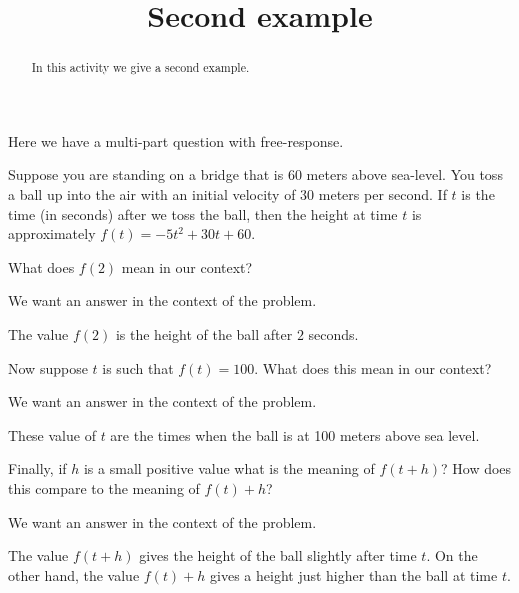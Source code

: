 \documentclass{ximera}
\title{Second example}
\begin{document}
\begin{abstract}
In this activity we give a second example.
\end{abstract} 
\maketitle

Here we have a multi-part question with free-response.

\begin{problem} 
Suppose you are standing on a bridge that is 60 meters above
sea-level. You toss a ball up into the air with an initial velocity of
30 meters per second.  If $t$ is the time (in seconds) after we toss
the ball, then the height at time $t$ is approximately $f(t) = -5 t^2
+30t+60$. 
\begin{parts}[hide]
	\item What does $f(2)$ mean in our context?
	\begin{hints}
		\item We want an answer in the context of the problem. 
	\end{hints}
	\begin{prompt}
		\begin{freeResponse}
			The value $f(2)$ is the height of the ball after $2$ seconds.
		\end{freeResponse}
	\end{prompt}
	\item Now suppose $t$ is such that $f(t) = 100$. What does this mean in our context?
	\begin{hints}
		\item We want an answer in the context of the problem. 
	\end{hints}
	\begin{prompt}
		\begin{freeResponse}
			These value of $t$ are the times when the ball is at 100 meters above sea level.
		\end{freeResponse}
	\end{prompt}
	\item Finally, if $h$ is a small positive value what is the meaning of $f(t+h)$? How does this compare to the meaning of $f(t)+h$?
	\begin{hints}
		\item We want an answer in the context of the problem. 
	\end{hints}
	\begin{prompt}
		\begin{freeResponse}
			The value $f(t+h)$ gives the height of the ball slightly after time $t$. On the other hand, the value $f(t)+h$ gives a height just higher than the ball at time $t$.
		\end{freeResponse}
	\end{prompt}
\end{parts}
\end{problem}
\end{document}
